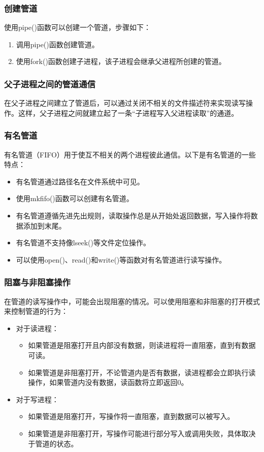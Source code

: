 \documentclass[12pt, a4paper, oneside]{ctexbook}
\numberwithin{figure}{section}
\begin{document}
\subsubsection{创建管道}
使用pipe()函数可以创建一个管道，步骤如下：
\begin{enumerate}
    \item 调用pipe()函数创建管道。
    \item 使用fork()函数创建子进程，该子进程会继承父进程所创建的管道。
\end{enumerate}

\subsubsection{父子进程之间的管道通信}
在父子进程之间建立了管道后，可以通过关闭不相关的文件描述符来实现读写操作。这样，父子进程之间就建立起了一条“子进程写入父进程读取”的通道。

\subsubsection{有名管道}
有名管道（FIFO）用于使互不相关的两个进程彼此通信。以下是有名管道的一些特点：
\begin{itemize}
    \item 有名管道通过路径名在文件系统中可见。
    \item 使用mkfifo()函数可以创建有名管道。
    \item 有名管道遵循先进先出规则，读取操作总是从开始处返回数据，写入操作将数据添加到末尾。
    \item 有名管道不支持像lseek()等文件定位操作。
    \item 可以使用open()、read()和write()等函数对有名管道进行读写操作。
\end{itemize}

\subsubsection{阻塞与非阻塞操作}
在管道的读写操作中，可能会出现阻塞的情况。可以使用阻塞和非阻塞的打开模式来控制管道的行为：
\begin{itemize}
    \item 对于读进程：
    \begin{itemize}
        \item 如果管道是阻塞打开且内部没有数据，则读进程将一直阻塞，直到有数据可读。
        \item 如果管道是非阻塞打开，不论管道内是否有数据，读进程都会立即执行读操作，如果管道内没有数据，读函数将立即返回0。
    \end{itemize}
    \item 对于写进程：
    \begin{itemize}
        \item 如果管道是阻塞打开，写操作将一直阻塞，直到数据可以被写入。
        \item 如果管道是非阻塞打开，写操作可能进行部分写入或调用失败，具体取决于管道的状态。
    \end{itemize}
\end{itemize}
\end{document}
